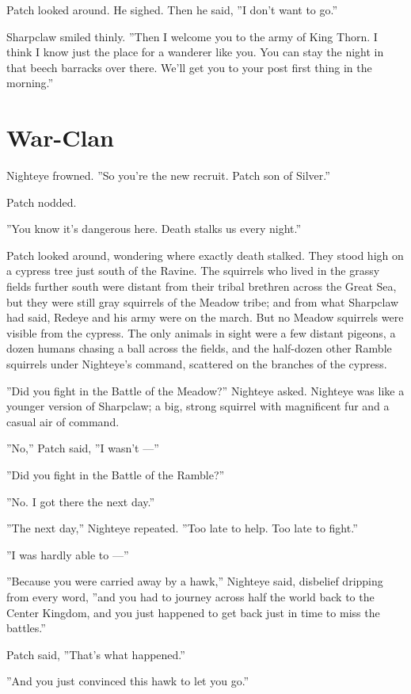\documentclass[12pt]{book}
\begin{document}
Patch looked around. He sighed. Then he said, ''I don't want to go.''

Sharpclaw smiled thinly. ''Then I welcome you to the army of King
Thorn. I think I know just the place for a wanderer like you. You can
stay the night in that beech barracks over there. We'll get you to
your post first thing in the morning.''


\section{War-Clan}

Nighteye frowned. ''So you're the new recruit. Patch son of Silver.''

Patch nodded.

''You know it's dangerous here. Death stalks us every night.''

Patch looked around, wondering where exactly death stalked. They stood
high on a cypress tree just south of the Ravine. The squirrels who
lived in the grassy fields further south were distant from their
tribal brethren across the Great Sea, but they were still gray
squirrels of the Meadow tribe; and from what Sharpclaw had said,
Redeye and his army were on the march. But no Meadow squirrels were
visible from the cypress. The only animals in sight were a few distant
pigeons, a dozen humans chasing a ball across the fields, and the
half-dozen other Ramble squirrels under Nighteye's command, scattered
on the branches of the cypress.

''Did you fight in the Battle of the Meadow?'' Nighteye
asked. Nighteye was like a younger version of Sharpclaw; a big, strong
squirrel with magnificent fur and a casual air of command.

''No,'' Patch said, ''I wasn't ---''

''Did you fight in the Battle of the Ramble?''

''No. I got there the next day.''

''The next day,'' Nighteye repeated. ''Too late to help. Too late to
fight.''

''I was hardly able to ---''

''Because you were carried away by a hawk,'' Nighteye said, disbelief
dripping from every word, ''and you had to journey across half the
world back to the Center Kingdom, and you just happened to get back
just in time to miss the battles.''

Patch said, ''That's what happened.''

''And you just convinced this hawk to let you go.''
\end{document}
